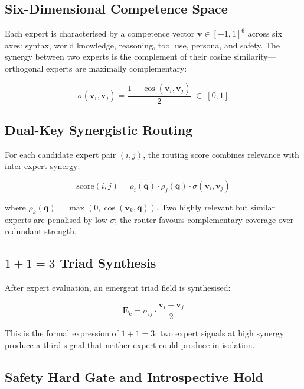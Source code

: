 \documentclass[journal,10pt,twocolumn]{IEEEtran}
\begin{document}
\subsection{Six-Dimensional Competence Space}

Each expert is characterised by a competence vector
$\mathbf{v} \in [-1,1]^6$ across six axes: syntax, world knowledge,
reasoning, tool use, persona, and safety. The synergy between two experts
is the complement of their cosine similarity---orthogonal experts are
maximally complementary:

\begin{equation}
  \sigma(\mathbf{v}_i, \mathbf{v}_j)
    = \frac{1 - \cos(\mathbf{v}_i, \mathbf{v}_j)}{2}
    \;\in\; [0, 1]
  \label{eq:synergy}
\end{equation}

\subsection{Dual-Key Synergistic Routing}

For each candidate expert pair $(i, j)$, the routing score combines
relevance with inter-expert synergy:

\begin{equation}
  \mathrm{score}(i, j)
    = \rho_i(\mathbf{q}) \cdot \rho_j(\mathbf{q}) \cdot \sigma(\mathbf{v}_i, \mathbf{v}_j)
  \label{eq:routing}
\end{equation}

where $\rho_k(\mathbf{q}) = \max(0, \cos(\mathbf{v}_k, \mathbf{q}))$.
Two highly relevant but similar experts are penalised by low $\sigma$; the
router favours complementary coverage over redundant strength.

\subsection{$1{+}1{=}3$ Triad Synthesis}

After expert evaluation, an emergent triad field is synthesised:

\begin{equation}
  \mathbf{E}_k = \sigma_{ij} \cdot \frac{\mathbf{v}_i + \mathbf{v}_j}{2}
  \label{eq:triad}
\end{equation}

This is the formal expression of $1{+}1{=}3$: two expert signals at high
synergy produce a third signal that neither expert could produce in isolation.

\subsection{Safety Hard Gate and Introspective Hold}
\end{document}
